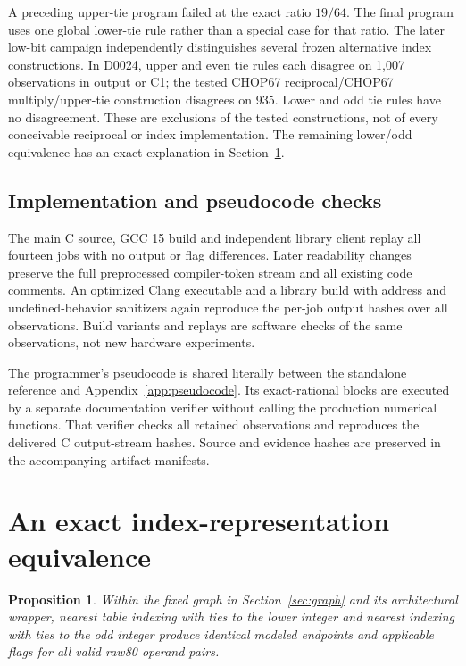\documentclass[11pt]{article}
\newtheorem{proposition}{Proposition}
\begin{document}
A preceding upper-tie program failed at the exact ratio $19/64$. The final
program uses one global lower-tie rule rather than a special case for that
ratio. The later low-bit campaign independently distinguishes several
frozen alternative index constructions. In D0024, upper and even tie rules
each disagree on 1,007 observations in output or C1; the tested CHOP67
reciprocal/CHOP67 multiply/upper-tie construction disagrees on 935. Lower
and odd tie rules have no disagreement. These are exclusions of the tested
constructions, not of every conceivable reciprocal or index implementation.
The remaining lower/odd equivalence has an exact explanation in
Section~\ref{sec:alias}.

\subsection{Implementation and pseudocode checks}

The main C source, GCC 15 build and independent library client replay all
fourteen jobs with no output or flag differences. Later readability changes
preserve the full preprocessed compiler-token stream and all existing code
comments. An optimized Clang executable and a library build with address
and undefined-behavior sanitizers again reproduce the per-job output hashes over
all \CorpusRows{} observations. Build variants and replays are software
checks of the same observations, not new hardware experiments.

The programmer's pseudocode is shared literally between the standalone
reference and Appendix~\ref{app:pseudocode}. Its exact-rational blocks are
executed by a separate documentation verifier without calling the production
numerical functions. That verifier checks all \CorpusRows{} retained
observations and reproduces the delivered C output-stream hashes. Source
and evidence hashes are preserved in the accompanying artifact manifests.

\section{An exact index-representation equivalence}
\label{sec:alias}

\begin{proposition}
Within the fixed graph in Section~\ref{sec:graph} and its architectural
wrapper, nearest table indexing with ties to the lower integer and nearest
indexing with ties to the odd integer produce identical modeled endpoints
and applicable flags for all valid raw80 operand pairs.
\end{proposition}
\end{document}
